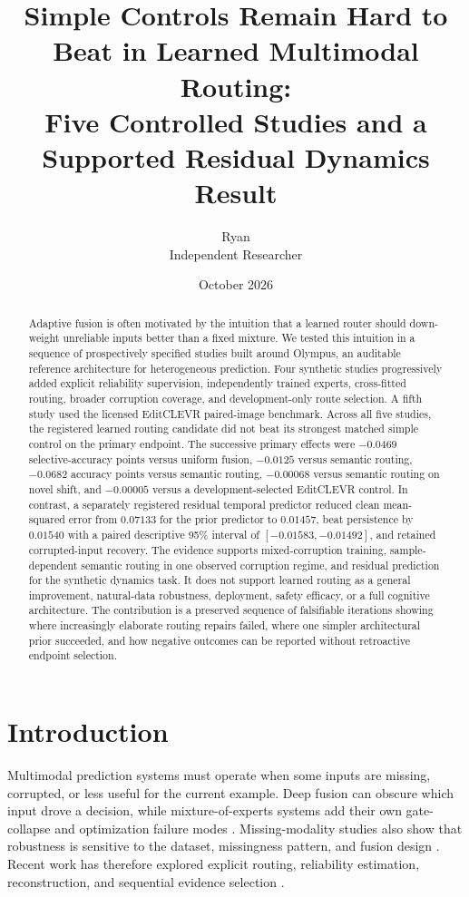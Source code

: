 \documentclass[10pt]{article}
\title{Simple Controls Remain Hard to Beat in Learned Multimodal Routing:\\
\large Five Controlled Studies and a Supported Residual Dynamics Result}
\author{Ryan\\Independent Researcher}
\date{October 2026}
\begin{document}
\maketitle

\begin{abstract}
Adaptive fusion is often motivated by the intuition that a learned router should
down-weight unreliable inputs better than a fixed mixture. We tested this intuition in a
sequence of prospectively specified studies built around Olympus, an auditable reference
architecture for heterogeneous prediction. Four synthetic studies progressively added
explicit reliability supervision, independently trained experts, cross-fitted routing,
broader corruption coverage, and development-only route selection. A fifth study used the
licensed EditCLEVR paired-image benchmark. Across all five studies, the registered learned
routing candidate did not beat its strongest matched simple control on the primary
endpoint. The successive primary effects were $-0.0469$ selective-accuracy points versus
uniform fusion, $-0.0125$ versus semantic routing, $-0.0682$ accuracy points versus
semantic routing, $-0.00068$ versus semantic routing on novel shift, and $-0.00005$
versus a development-selected EditCLEVR control. In contrast, a separately registered
residual temporal predictor reduced clean mean-squared error from $0.07133$ for the prior
predictor to $0.01457$, beat persistence by $0.01540$ with a paired descriptive 95\%
interval of $[-0.01583,-0.01492]$, and retained corrupted-input recovery. The evidence
supports mixed-corruption training, sample-dependent semantic routing in one observed
corruption regime, and residual prediction for the synthetic dynamics task. It does not
support learned routing as a general improvement, natural-data robustness, deployment,
safety efficacy, or a full cognitive architecture. The contribution is a preserved
sequence of falsifiable iterations showing where increasingly elaborate routing repairs
failed, where one simpler architectural prior succeeded, and how negative outcomes can be
reported without retroactive endpoint selection.
\end{abstract}

\section{Introduction}
Multimodal prediction systems must operate when some inputs are missing, corrupted, or
less useful for the current example. Deep fusion can obscure which input drove a decision,
while mixture-of-experts systems add their own gate-collapse and optimization failure
modes \cite{fedus2021switch,zhou2022expertchoice,wang2024lossfree}. Missing-modality
studies also show that robustness is sensitive to the dataset, missingness pattern, and
fusion design \cite{ma2022missing,maheshwari2023m3l}. Recent work has therefore explored
explicit routing, reliability estimation, reconstruction, and sequential evidence
selection \cite{hooman2026routing,kumar2026prime,wang2026metamodal}.
\end{document}
